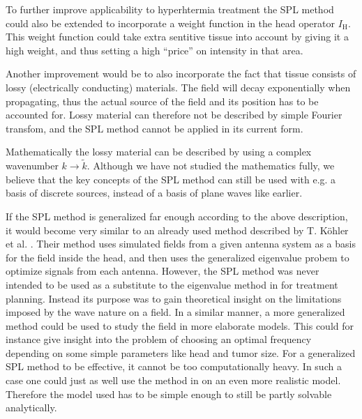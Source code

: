 \documentclass[11pt,a4paper, 
swedish,english %
]{article}
\begin{document}
To further improve applicability to hyperhtermia treatment the SPL
method could also be extended to incorporate a weight function in the
head operator $I_\text{H}$. This weight function could take extra
sentitive tissue into account by giving it a high weight, and thus
setting a high ``price'' on intensity in that area. 

Another improvement would be to also incorporate the fact that tissue
consists of lossy (electrically conducting) materials. 
The field will decay exponentially when propagating, thus the
actual source of the field and its position has to be accounted
for. Lossy material can therefore not be described by simple 
Fourier transfom, and the SPL method cannot be applied in its current
form. 

Mathematically the lossy material can be described by using a complex
wavenumber $k\to\tilde{k}$. Although we have not studied the mathematics 
fully, we believe that the key concepts of the SPL method can
still be used with e.g. a basis of discrete sources, instead of a
basis of plane waves like earlier. 


If the SPL method is generalized far enough according to the above
description, it would become very similar to an already used method
described by T. Köhler et al. \cite{Kohler2001}. Their method uses
simulated fields from a given antenna system as a basis for the field
inside the head, and then uses the generalized eigenvalue probem to
optimize signals from each antenna. 
However, the SPL method was never intended to be used as a substitute
to the eigenvalue method in \cite{Kohler2001} for treatment planning. 
Instead its purpose was to gain theoretical insight on the limitations
imposed by the wave nature on a field. In a similar manner, a more
generalized method could be used to study the field in more elaborate
models. This could for instance give insight into the problem of
choosing an optimal frequency depending on some simple parameters like
head and tumor size.
For a generalized SPL method to be effective, it cannot be too
computationally heavy. In such a case one could just as well use the
method in \cite{Kohler2001} on an even more realistic model. Therefore
the model used has to be simple enough to still be partly solvable
analytically. 
\end{document}
